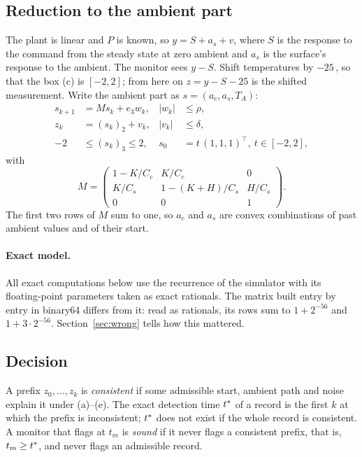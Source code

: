 \subsection{Reduction to the ambient part}\label{sec:reduce}

The plant is linear and $P$ is known, so $y = S + a_s + v$, where $S$ is the response to the command from the steady
state at zero ambient and $a_s$ is the surface's response to the ambient. The monitor sees $y - S$. Shift
temperatures by $-25$\,\degC, so that the box (c) is $[-2,2]$; from here on $z = y - S - 25$ is the shifted
measurement. Write the ambient part as $s = (a_c, a_s, T_A)$:
\begin{align*}
s_{k+1} &= M s_k + e_3 w_k, & |w_k|&\le\rho,\\
z_k &= (s_k)_2 + v_k, & |v_k|&\le\delta,\\
-2 &\le (s_k)_3\le 2, & s_0 &= t\,(1,1,1)^\top,\ t\in[-2,2],
\end{align*}
with
\[
M = \begin{pmatrix} 1-K/C_c & K/C_c & 0\\ K/C_s & 1-(K+H)/C_s & H/C_s\\ 0 & 0 & 1\end{pmatrix}.
\]
The first two rows of $M$ sum to one, so $a_c$ and $a_s$ are convex combinations of past ambient values and of their
start.

\paragraph{Exact model.} All exact computations below use the recurrence of the simulator with its floating-point
parameters taken as exact rationals. The matrix built entry by entry in binary64 differs from it: read as rationals,
its rows sum to $1+2^{-56}$ and $1+3\cdot2^{-56}$. Section~\ref{sec:wrong} tells how this mattered.

\subsection{Decision}\label{sec:decision}

A prefix $z_0,\dots,z_k$ is \emph{consistent} if some admissible start, ambient path and noise explain it under
(a)--(e). The exact detection time $t^{\ast}$ of a record is the first $k$ at which the prefix is inconsistent; $t^{\ast}$
does not exist if the whole record is consistent. A monitor that flags at $t_m$ is \emph{sound} if it never flags a
consistent prefix, that is, $t_m\ge t^{\ast}$, and never flags an admissible record.

